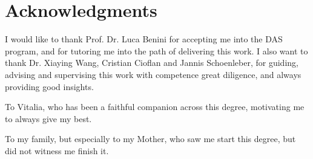 \chapter*{Acknowledgments}

I would like to thank Prof. Dr. Luca Benini for accepting me into the DAS program, and for tutoring me into the path of delivering this work.
I also want to thank Dr. Xiaying Wang, Cristian Cioflan and Jannis Schoenleber, for guiding, advising and supervising this work with competence great diligence, and always providing good insights.

To Vitalia, who has been a faithful companion across this degree, motivating me to always give my best.

To my family, but especially to my Mother, who saw me start this degree, but did not witness me finish it.
